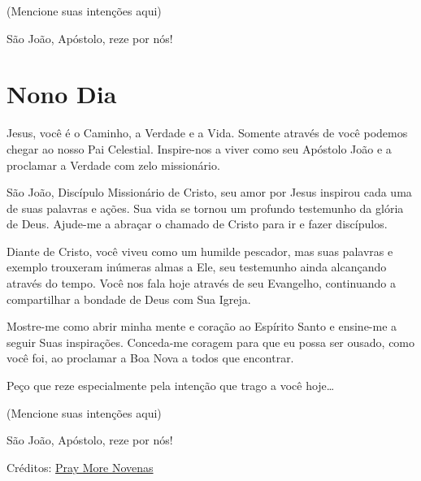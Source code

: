 \documentclass[11pt]{article}
\begin{document}
(Mencione suas intenções aqui)

São João, Apóstolo, reze por nós!


\section{Nono Dia}

Jesus, você é o Caminho, a Verdade e a Vida. Somente através de você podemos chegar ao nosso Pai Celestial. Inspire-nos a viver como seu Apóstolo João e a proclamar a Verdade com zelo missionário.

São João, Discípulo Missionário de Cristo, seu amor por Jesus inspirou cada uma de suas palavras e ações. Sua vida se tornou um profundo testemunho da glória de Deus. Ajude-me a abraçar o chamado de Cristo para ir e fazer discípulos.

Diante de Cristo, você viveu como um humilde pescador, mas suas palavras e exemplo trouxeram inúmeras almas a Ele, seu testemunho ainda alcançando através do tempo. Você nos fala hoje através de seu Evangelho, continuando a compartilhar a bondade de Deus com Sua Igreja.

Mostre-me como abrir minha mente e coração ao Espírito Santo e ensine-me a seguir Suas inspirações. Conceda-me coragem para que eu possa ser ousado, como você foi, ao proclamar a Boa Nova a todos que encontrar.

Peço que reze especialmente pela intenção que trago a você hoje…

(Mencione suas intenções aqui)

São João, Apóstolo, reze por nós!


Créditos: \href{https://www.praymorenovenas.com/st-john-the-apostle}{Pray More Novenas}
\end{document}
